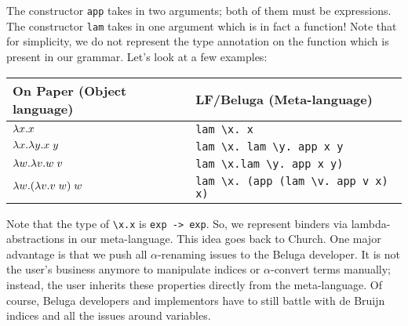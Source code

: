 The constructor \lstinline!app! takes in two arguments; both of them
must be expressions. The constructor \lstinline!lam! takes in one
argument which is in fact a function! Note that for simplicity, we do
not represent the type annotation on the function which is present in
our grammar.
%
Let's look at a few examples:
\begin{center}
\begin{tabular}{l@{\quad}|@{\quad}l}
  On Paper (Object language) & LF/Beluga (Meta-language)\\
  \hline
  $\lambda x.x$ & \lstinline!lam \x. x! \\
  $\lambda x.\lambda y. x \; y$ &
  \lstinline!lam \x. lam \y. app x y! \\
  $\lambda w.\lambda v. w \; v$ &
  \lstinline!lam \x.lam \y. app x y)! \\
  $\lambda w. (\lambda v. v \; w) \; w$
  & \lstinline!lam \x. (app (lam \v. app v x) x)!
\end{tabular}
\end{center}

Note that the type of \lstinline!\x.x! is \lstinline!exp -> exp!. So,
we represent binders  via lambda-abstractions in our
meta-language. This idea goes back to Church. One major advantage is
that we push all $\alpha$-renaming issues to the Beluga developer. It
is not the user's business anymore to manipulate indices or
$\alpha$-convert terms manually; instead, the user inherits these
properties directly from the meta-language. Of course, Beluga developers and
implementors have to still battle with de Bruijn indices and all the issues
around variables.


